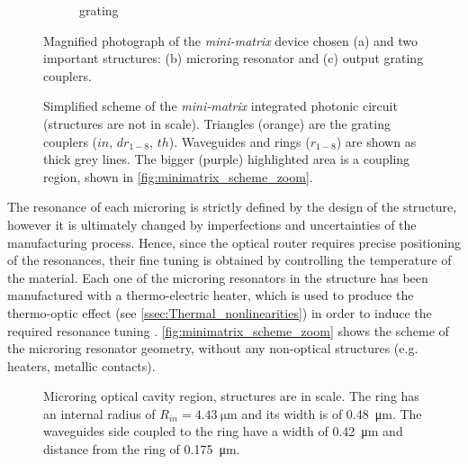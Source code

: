 \begin{figure}[htbp]
\begin{subfigure}[t]{0.345\textwidth}
		\caption{grating}
		\label{fig:photo_grating}
	\end{subfigure}
	\caption{Magnified photograph of the \textit{mini-matrix} device chosen (a) and two important structures: (b) microring resonator and (c) output grating couplers. }
	\label{fig:photos}
\end{figure}

\begin{figure}[hbtp]
	\centering
	
	\caption{
		Simplified scheme of the \textit{mini-matrix} integrated photonic circuit (structures are not in scale).
		Triangles (orange) are the grating couplers ($in$, $dr_{1-8}$, $th$).
		Waveguides and rings ($r_{1-8}$) are shown as thick grey lines.
		The bigger (purple) highlighted area is a coupling region, shown in \autoref{fig:minimatrix_scheme_zoom}.
	}
	\label{fig:minimatrix_scheme}
\end{figure}

The resonance of each microring is strictly defined by the design of the structure, however it is ultimately changed by imperfections and uncertainties of the manufacturing process.
Hence, since the optical router requires precise positioning of the resonances, their fine tuning is obtained by controlling the temperature of the material.
Each one of the microring resonators in the structure has been manufactured with a thermo-electric heater, which is used to produce the thermo-optic effect (see \autoref{ssec:Thermal_nonlinearities}) in order to induce the required resonance tuning \cite{testa2016design}.
\autoref{fig:minimatrix_scheme_zoom} shows the scheme of the microring resonator geometry, without any non-optical structures (e.g. heaters, metallic contacts).

\begin{figure}[htbp]
	\centering
	
	\caption{
	Microring optical cavity region, structures are in scale.
	The ring has an internal radius of $R_{in}=\SI{4.43}{\um}$ and its width is of \SI{0.48}{\um}.
	The waveguides side coupled to the ring have a width of \SI{0.42}{\um} and distance from the ring of \SI{.175}{\um}.
	}
	\label{fig:minimatrix_scheme_zoom}
\end{figure}


